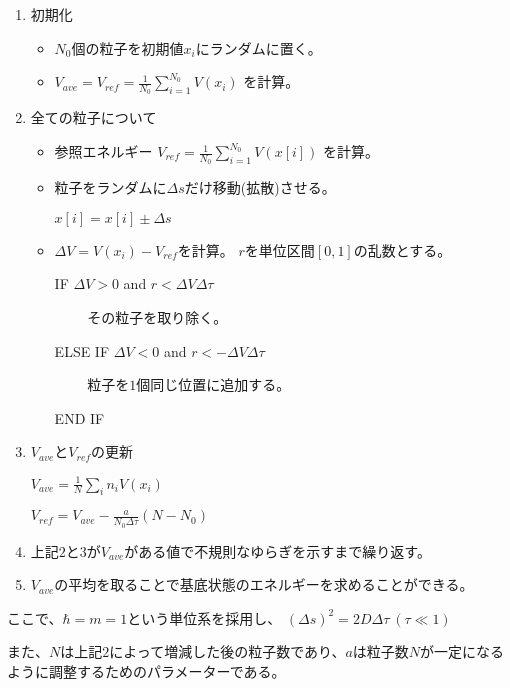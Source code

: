 \documentclass[dvipdfmx]{beamer}
\begin{document}
    \begin{frame}{\insertsubsection}
        \begin{enumerate}
            \item 初期化
            \begin{itemize}
                \item $N_0$個の粒子を初期値$x_i$にランダムに置く。
                \item $V_{ave} = V_{ref} = \frac{1}{N_0} \sum_{i=1}^{N_0}V(x_i)$ を計算。
            \end{itemize}
            \item 全ての粒子について
            \begin{itemize}
                \item 参照エネルギー
                $V_{ref} = \frac{1}{N_0}\sum_{i=1}^{N_0}V(x[i])$
                を計算。
                \item 粒子をランダムに$\Delta s$だけ移動(拡散)させる。

                $x[i] = x[i] \pm \Delta s$

                \item $\Delta V = V(x_i) - V_{ref}$を計算。
                $r$を単位区間$[0,1]$の乱数とする。

                IF $\Delta V > 0$ and $r < \Delta V \Delta \tau$

                ~~~~ その粒子を取り除く。

                ELSE IF $\Delta V < 0$ and $r < -\Delta V \Delta \tau$

                ~~~~ 粒子を$1$個同じ位置に追加する。

                END IF
            \end{itemize}

        \end{enumerate}
    \end{frame}

    \begin{frame}
        \begin{enumerate}
            \setcounter{enumi}{2}
            \item $V_{ave}$と$V_{ref}$の更新

            $V_{ave} = \frac{1}{N}\sum_{i} n_i V(x_i)$

            $V_{ref} = V_{ave} - \frac{a}{N_0\Delta\tau}(N-N_0)$

            \item 上記$2$と$3$が$V_{ave}$がある値で不規則なゆらぎを示すまで繰り返す。

            \item $V_{ave}$の平均を取ることで基底状態のエネルギーを求めることができる。
        \end{enumerate}
        ここで、$\hbar = m = 1$という単位系を採用し、
        $(\Delta s)^2 = 2D\Delta \tau~(\tau \ll 1)$

        また、$N$は上記$2$によって増減した後の粒子数であり、$a$は粒子数$N$が一定になるように調整するためのパラメーターである。
    \end{frame}
\end{document}

